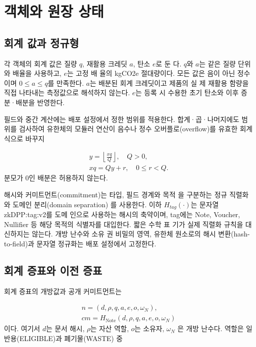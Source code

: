 \section{객체와 원장 상태}

\subsection{회계 값과 정규형}
각 객체의 회계 값은 질량 \(q\), 재활용 크레딧 \(a\), 탄소 \(e\)로 둔
다. \(q\)와 \(a\)는 같은 질량 단위와 배율을 사용하고, \(e\)는 고정 배
율의 kgCO2e 절대량이다. 모든 값은 음이 아닌 정수이며
\(0≤a≤q\)를 만족한다. \(a\)는 배분된 회계 크레딧이고 제품의 실
제 재활용 함량을 직접 나타내는 측정값으로 해석하지 않는다.
\(e\)는 등록 시 수용한 초기 탄소와 이후 증분·배분을 반영한다.

필드와 중간 계산에는 배포 설정에서 정한 범위를 적용한다.
합계·곱·나머지에도 범위를 검사하여 유한체의 모듈러 연산이
음수나 정수 오버플로(overflow)를 유효한 회계식으로 바꾸지

\begin{equation}
    \begin{gathered}y=\left\lfloor\frac{xq}{Q}\right\rfloor,\quad Q>0,\\xq=Qy+r,\quad 0\le r<Q.\end{gathered}\tag{3}
\end{equation}
분모가 0인 배분은 허용하지 않는다.

해시와 커미트먼트(commitment)는 타입, 필드 경계와 목적
을 구분하는 정규 직렬화와 도메인 분리(domain separation)
를 사용한다. 이하 \(H_{tag}(·)\)는 문자열 zkDPP:tag:v2를 도메
인으로 사용하는 해시의 축약이며, tag에는 Note, Voucher,
Nullifier 등 해당 목적의 식별자를 대입한다. 짧은 수학 표
기가 실제 직렬화 규칙을 대신하지는 않는다. 개방 난수와 소유
권 비밀의 영역, 유한체 원소로의 해시 변환(hash-to-field)과
문자열 정규화는 배포 설정에서 고정한다.

\subsection{회계 증표와 이전 증표}
회계 증표의 개방값과 공개 커미트먼트는

\begin{equation}
    \begin{gathered}n=(d,\rho,q,a,e,o,\omega_N),\\cm=H_{\mathrm{Note}}(d,\rho,q,a,e,o,\omega_N)\end{gathered}\tag{4}
\end{equation}
이다. 여기서 \(d\)는 문서 해시, \(ρ\)는 자산 역할, \(o\)는 소유자, \(ω_{N}\) 은
개방 난수다. 역할은 일반용(ELIGIBLE)과 폐기물(WASTE) 중

